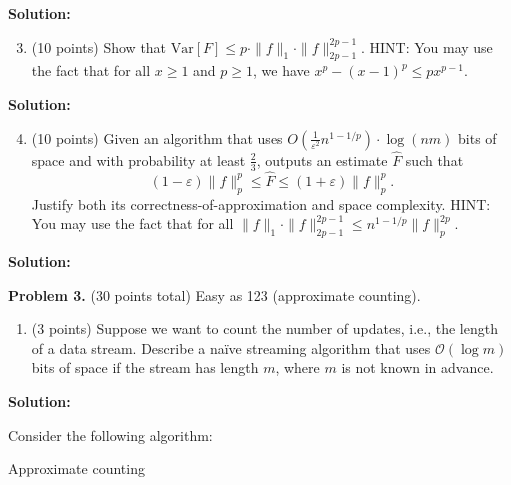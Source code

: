 \documentclass[11pt]{article}
\newcommand{\Var}[1]{\ensuremath{\text{Var}\left[#1\right]}}
\newcommand{\eps}{\varepsilon}
\begin{document}
\noindent\textbf{Solution:}




\begin{enumerate}
\setcounter{enumi}{2}
\item (10 points)
Show that $\Var{F}\le p\cdot\|f\|_1\cdot\|f\|_{2p-1}^{2p-1}$. 
\vskip 0.1in\noindent
HINT: You may use the fact that for all $x\ge 1$ and $p\ge 1$, we have $x^p-(x-1)^p\le px^{p-1}$. 
\end{enumerate}

\noindent\textbf{Solution:}





\begin{enumerate}
\setcounter{enumi}{3}
\item (10 points)
Given an algorithm that uses $O\left(\frac{1}{\eps^2}n^{1-1/p}\right)\cdot\log(nm)$ bits of space and with probability at least $\frac{2}{3}$, outputs an estimate $\widehat{F}$ such that
\[(1-\eps)\|f\|_p^p\le\widehat{F}\le(1+\eps)\|f\|_p^p.\]
Justify both its correctness-of-approximation and space complexity. 
\vskip 0.1in\noindent
HINT: You may use the fact that for all $\|f\|_1\cdot\|f\|_{2p-1}^{2p-1}\le n^{1-1/p}\|f\|_p^{2p}$. 
\end{enumerate}

\noindent\textbf{Solution:}










\newpage\noindent
\textbf{Problem 3.} (30 points total)
Easy as 123 (approximate counting).
\begin{enumerate}
\item (3 points)
Suppose we want to count the number of updates, i.e., the length of a data stream. 
Describe a na\"{i}ve streaming algorithm that uses $\mathcal{O}(\log m)$ bits of space if the stream has length $m$, where $m$ is not known in advance. 
\end{enumerate}

\noindent\textbf{Solution:}



\vskip 0.1in\noindent
Consider the following algorithm:
\begin{algorithm}[!htb]
\caption{Approximate counting}
\begin{algorithmic}[1]
\EndIf
\EndFor
{}
\end{algorithmic}
\end{algorithm}
\end{document}
